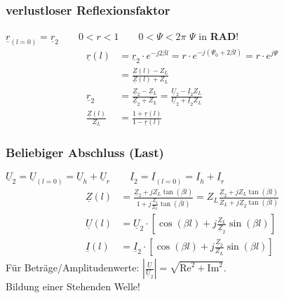 \subsubsection{verlustloser Reflexionsfaktor}

$ \underline{r}_{(l=0)} = \underline{r}_2 \qquad 0<r<1 \qquad 0<\Psi<2\pi $ $\Psi$ in \textbf{RAD}!
\begin{align*}
	\underline{r}(l)  &= \underline{r}_2 \cdot e^{-j2\beta l} = r \cdot e^{-j(\Psi_0+2\beta l)} =r\cdot e^{j\Psi} \\ &=\tfrac{\underline{Z}(l)-Z_L}{\underline{Z}(l)+Z_L}\\
	\underline{r}_2 & = \tfrac{\underline{Z}_2-Z_L}{\underline{Z}_2+Z_L} = \tfrac{\underline{U}_2-\underline{I}_2Z_L}{\underline{U}_2 +\underline{I}_2 Z_L}\\
	\tfrac{\underline{Z}(l)}{Z_L} & = \tfrac{1+\underline{r}(l)}{1-\underline{r}(l)}
\end{align*}
\subsubsection{Beliebiger Abschluss (Last)} \label{beliebig_abschluss}
$\underline{U}_2 = \underline{U}_{(l=0)} =  \underline{U}_h  +\underline{U}_r \qquad \underline{I}_2 = \underline{I}_{(l=0)} =  \underline{I}_h  +\underline{I}_r $	
\begin{align*}
	\underline{Z}(l) & = 
	\frac{\underline{Z}_2+jZ_L\tan(\beta 
	l)}{1+ j \frac{\underline{Z}_2}{Z_L}\tan(\beta l)}
	= Z_L \frac{\underline{Z}_2 + j Z_L \tan(\beta l)}{Z_L + j \underline{Z}_2 \tan(\beta l)}\\
	\underline{U}(l) & = \underline{U}_2 \cdot \left[ \cos(\beta l) + j \tfrac{Z_L}{\underline{Z}_2} \sin(\beta l) \right] \\
	\underline{I}(l) & = \underline{I}_2 \cdot \left[ \cos(\beta l) + j \tfrac{\underline{Z}_2}{Z_L} \sin(\beta l) \right] 
\end{align*}
Für Beträge/Amplitudenwerte: \quad $\left| \frac{\underline{U}}{\underline{U}_2} \right| = \sqrt{\text{Re}^2+\text{Im}^2}  $.\\
Bildung einer Stehenden Welle!
